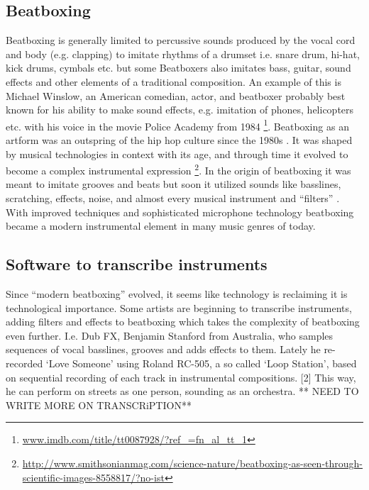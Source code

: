 \subsection{ Beatboxing }
Beatboxing is generally limited to percussive sounds produced by the vocal cord and body (e.g. clapping) to imitate rhythms of a drumset i.e. snare drum, hi-hat, kick drums, cymbals etc. but some Beatboxers also imitates bass, guitar, sound effects and other elements of a traditional composition. An example of this is Michael Winslow, an American comedian, actor, and beatboxer probably best known for his ability to make sound effects, e.g. imitation of phones, helicopters etc. with his voice in the movie Police Academy from 1984 \footnote{\url{www.imdb.com/title/tt0087928/?ref_=fn_al_tt_1}}. Beatboxing as an artform was an outspring of the hip hop culture since the 1980s \citep{Sinyor05}. It was shaped by musical technologies in context with its age, and through time it evolved to become a complex instrumental expression \footnote{\url{http://www.smithsonianmag.com/science-nature/beatboxing-as-seen-through-scientific-images-8558817/?no-ist}}. In the origin of beatboxing it was meant to imitate grooves and beats but soon it utilized sounds like basslines, scratching, effects, noise, and almost every musical instrument and “filters” \citep{proctor2012}. With improved techniques and sophisticated microphone technology beatboxing became a modern instrumental element in many music genres of today.

\subsection{ Software to transcribe instruments }
Since “modern beatboxing” evolved, it seems like technology is reclaiming it is technological importance. Some artists are beginning to transcribe instruments, adding filters and effects to beatboxing which takes the complexity of beatboxing even further. I.e. Dub FX, Benjamin Stanford from Australia, who samples sequences of vocal basslines, grooves and adds effects to them. Lately he re-recorded ‘Love Someone’ using Roland RC-505, a so called ‘Loop Station’, based on sequential recording of each track in instrumental compositions. [2] This way, he can perform on streets as one person, sounding as an orchestra. ** NEED TO WRITE MORE ON TRANSCRiPTION**

